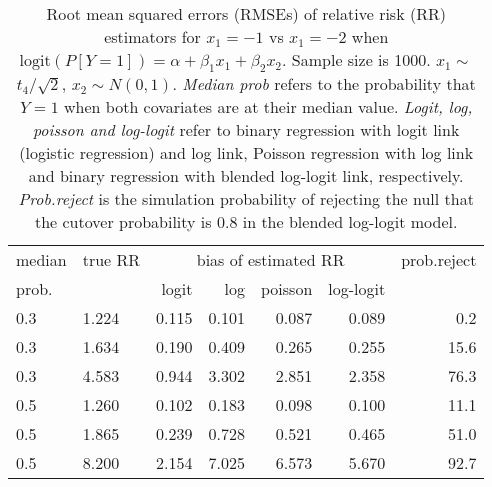 \documentclass[12pt,a4paper]{article}
\begin{document}
\begin{table}[H] 
\small\sf\centering 
\caption{Root mean squared errors (RMSEs) of relative risk (RR) estimators for $x_1=-1$ vs $x_1=-2$ when $\mbox{logit}(P[Y=1])=\alpha+\beta_1 x_1 + \beta_2 x_2$. Sample size is 1000. $x_1 \sim $$t_4/\sqrt{2}$, $x_2 \sim N(0,1)$. {\it Median prob} refers to the probability that $Y=1$ when both covariates are at their median value. {\it Logit, log, poisson and log-logit} refer to binary regression with logit link (logistic regression) and log link, Poisson regression with log link and binary regression with blended log-logit link, respectively. {\it Prob.reject} is the simulation probability of rejecting the null that the cutover probability is $0.8$ in the blended log-logit model.} 
\begin{tabular}{llrrrrr} 
\toprule 
median & true RR & \multicolumn{4}{c}{bias of estimated RR} & prob.reject \\ 
prob. & & logit & log & poisson & log-logit  & \\ \midrule 
0.3 & 1.224 & 0.115 & 0.101 & 0.087 & 0.089 &  0.2 \\  
0.3 & 1.634 & 0.190 & 0.409 & 0.265 & 0.255 & 15.6 \\  
0.3 & 4.583 & 0.944 & 3.302 & 2.851 & 2.358 & 76.3 \\  
0.5 & 1.260 & 0.102 & 0.183 & 0.098 & 0.100 & 11.1 \\  
0.5 & 1.865 & 0.239 & 0.728 & 0.521 & 0.465 & 51.0 \\  
0.5 & 8.200 & 2.154 & 7.025 & 6.573 & 5.670 & 92.7 \\  
\bottomrule 
\end{tabular} 
\end{table} 
\end{document}
